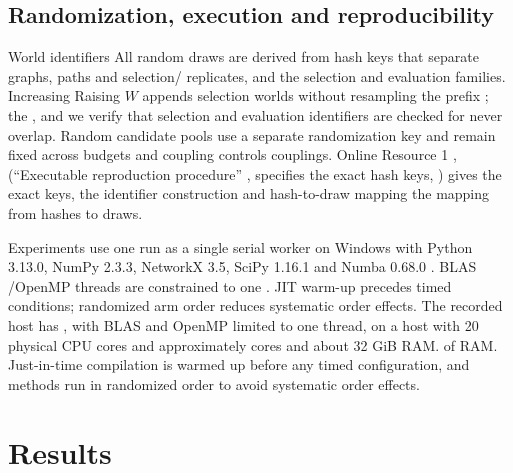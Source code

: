 \documentclass[smallextended]{svjour3}
\providecommand{\DIFaddtex}[1]{{\protect\color{blue} \sf #1}} %
\providecommand{\DIFdeltex}[1]{{\protect\color{red} \scriptsize #1}} %
\providecommand{\DIFaddbegin}{} %
\providecommand{\DIFaddend}{} %
\providecommand{\DIFdelbegin}{} %
\providecommand{\DIFdelend}{} %
\providecommand{\DIFadd}[1]{\texorpdfstring{\DIFaddtex{#1}}{#1}} %
\providecommand{\DIFdel}[1]{\texorpdfstring{\DIFdeltex{#1}}{}} %
\providecommand{\DIFscaledelfig}{0.5}
\newlength{\DIFdelgraphicswidth} %
\newlength{\DIFdelgraphicsheight} %
\providecommand{\DIFaddincludegraphics}[2][]{{\color{blue}\fbox{\DIFOincludegraphics[#1]{#2}}}} %
\providecommand{\DIFdelincludegraphics}[2][]{%
\sbox{\DIFdelgraphicsbox}{\DIFOincludegraphics[#1]{#2}}%
\settoboxwidth{\DIFdelgraphicswidth}{\DIFdelgraphicsbox} %
\settoboxtotalheight{\DIFdelgraphicsheight}{\DIFdelgraphicsbox} %
\scalebox{\DIFscaledelfig}{%
\parbox[b]{\DIFdelgraphicswidth}{\usebox{\DIFdelgraphicsbox}\\[-\baselineskip] \rule{\DIFdelgraphicswidth}{0em}}\llap{\resizebox{\DIFdelgraphicswidth}{\DIFdelgraphicsheight}{%
\setlength{\unitlength}{\DIFdelgraphicswidth}%
\begin{picture}(1,1)%
\thicklines\linethickness{2pt} %
{\color[rgb]{1,0,0}\put(0,0){\framebox(1,1){}}}%
{\color[rgb]{1,0,0}\put(0,0){\line( 1,1){1}}}%
{\color[rgb]{1,0,0}\put(0,1){\line(1,-1){1}}}%
\end{picture}%
}\hspace*{3pt}}} %
} %
\DeclareRobustCommand{\DIFaddbegin}{\DIFOaddbegin \let\includegraphics\DIFaddincludegraphics} %
\DeclareRobustCommand{\DIFaddend}{\DIFOaddend \let\includegraphics\DIFOincludegraphics} %
\DeclareRobustCommand{\DIFdelbegin}{\DIFOdelbegin \let\includegraphics\DIFdelincludegraphics} %
\DeclareRobustCommand{\DIFdelend}{\DIFOaddend \let\includegraphics\DIFOincludegraphics} %
\begin{document}
\subsection{Randomization, execution and reproducibility}
\DIFdelbegin \DIFdel{World identifiers }\DIFdelend \DIFaddbegin \DIFadd{All random draws are derived from hash keys that }\DIFaddend separate graphs, \DIFdelbegin \DIFdel{paths and selection/}\DIFdelend \DIFaddbegin \DIFadd{replicates, and the selection and }\DIFaddend evaluation families. \DIFdelbegin \DIFdel{Increasing }\DIFdelend \DIFaddbegin \DIFadd{Raising }\DIFaddend $W$ appends selection worlds without resampling the prefix\DIFdelbegin \DIFdel{; the }\DIFdelend \DIFaddbegin \DIFadd{, and we verify that }\DIFaddend selection and evaluation identifiers \DIFdelbegin \DIFdel{are checked for }\DIFdelend \DIFaddbegin \DIFadd{never }\DIFaddend overlap. Random \DIFdelbegin \DIFdel{candidate }\DIFdelend pools use a separate \DIFdelbegin \DIFdel{randomization }\DIFdelend key and remain fixed across budgets and \DIFdelbegin \DIFdel{coupling controls}\DIFdelend \DIFaddbegin \DIFadd{couplings}\DIFaddend . Online Resource 1 \DIFdelbegin \DIFdel{, }\DIFdelend \DIFaddbegin \DIFadd{(}\DIFaddend ``Executable reproduction procedure''\DIFdelbegin \DIFdel{, specifies the exact hash keys, }\DIFdelend \DIFaddbegin \DIFadd{) gives the exact keys, the }\DIFaddend identifier construction and \DIFdelbegin \DIFdel{hash-to-draw mapping }\DIFdelend \DIFaddbegin \DIFadd{the mapping from hashes to draws}\DIFaddend .

Experiments \DIFdelbegin \DIFdel{use one }\DIFdelend \DIFaddbegin \DIFadd{run as a single }\DIFaddend serial worker on Windows with Python 3.13.0, NumPy 2.3.3, NetworkX 3.5, SciPy 1.16.1 and Numba 0.68.0\DIFdelbegin \DIFdel{. BLAS /OpenMP threads are constrained to one . JIT warm-up precedes timed conditions; randomized arm order reduces systematic order effects. The recorded host has }\DIFdelend \DIFaddbegin \DIFadd{, with BLAS and OpenMP limited to one thread, on a host with }\DIFaddend 20 physical \DIFdelbegin \DIFdel{CPU cores and approximately }\DIFdelend \DIFaddbegin \DIFadd{cores and about }\DIFaddend 32 GiB \DIFdelbegin \DIFdel{RAM.
}\DIFdelend \DIFaddbegin \DIFadd{of RAM. Just-in-time compilation is warmed up before any timed configuration, and methods run in randomized order to avoid systematic order effects.
}\DIFaddend 

\section{Results}
\end{document}
